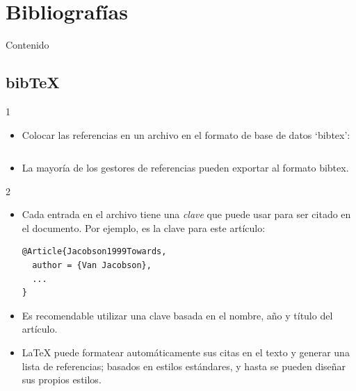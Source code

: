 \documentclass{beamer}
\begin{document}
\section{Bibliografías}

\begin{frame}{Contenido}
  \begin{multicols}{2}
    \tableofcontents[currentsection]
  \end{multicols}
\end{frame}

\subsection{bib\TeX}
\begin{frame}[fragile]{\insertsubsection{} 1}
  \begin{itemize}
  \item Colocar las referencias en un archivo  en el
    formato de base de datos  `bibtex':
    \inputminted[fontsize=\scriptsize,frame=single]{latex}{es/bib-example.bib}
  \item La mayoría de los gestores de referencias pueden exportar al
    formato bibtex.
  \end{itemize}
\end{frame}

\begin{frame}[fragile]{\insertsubsection{} 2}
  \begin{itemize}
  \item Cada entrada en el archivo   tiene una \emph{clave}
    que puede usar para ser citado en el documento. Por ejemplo,
     es la clave para este artículo:
    \begin{verbatim}
@Article{Jacobson1999Towards,
  author = {Van Jacobson},
  ...
}
    \end{verbatim}
  \item Es recomendable utilizar una clave basada en el nombre, año y
    título del artículo.
  \item \LaTeX{} puede formatear automáticamente sus citas en el texto
    y generar una lista de referencias; basados en estilos estándares,
    y hasta se pueden diseñar sus propios estilos.
  \end{itemize}
\end{frame}
\end{document}
